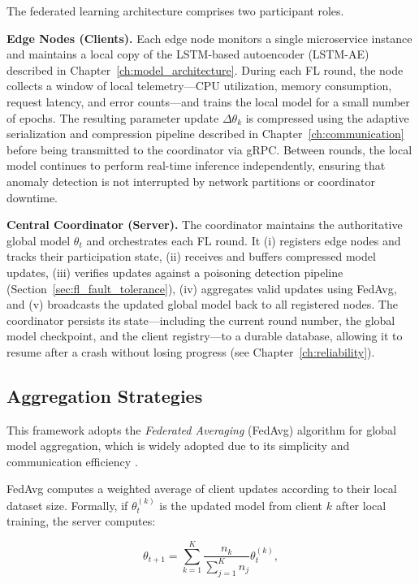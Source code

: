 The federated learning architecture comprises two participant roles.

\textbf{Edge Nodes (Clients).} Each edge node monitors a single microservice
instance and maintains a local copy of the LSTM-based autoencoder (LSTM-AE)
described in Chapter~\ref{ch:model_architecture}. During each FL round, the
node collects a window of local telemetry---CPU utilization, memory consumption,
request latency, and error counts---and trains the local model for a small
number of epochs. The resulting parameter update $\Delta\theta_k$ is compressed
using the adaptive serialization and compression pipeline described in
Chapter~\ref{ch:communication} before being transmitted to the coordinator via
gRPC. Between rounds, the local model continues to perform real-time inference
independently, ensuring that anomaly detection is not interrupted by network
partitions or coordinator downtime.

\textbf{Central Coordinator (Server).} The coordinator maintains the
authoritative global model $\theta_t$ and orchestrates each FL round. It (i)
registers edge nodes and tracks their participation state, (ii) receives and
buffers compressed model updates, (iii) verifies updates against a poisoning
detection pipeline (Section~\ref{sec:fl_fault_tolerance}), (iv) aggregates
valid updates using FedAvg, and (v) broadcasts the updated global model back to
all registered nodes. The coordinator persists its state---including the current
round number, the global model checkpoint, and the client registry---to a
durable database, allowing it to resume after a crash without losing progress
(see Chapter~\ref{ch:reliability}).

\subsection{Aggregation Strategies}
\label{subsec:fl_aggregation}

This framework adopts the \textit{Federated Averaging} (FedAvg) algorithm for 
global model aggregation, which is widely adopted due to its simplicity and 
communication efficiency \cite{mcmahan2017communication}.

FedAvg computes a weighted average of client updates according to their local dataset 
size. Formally, if $\theta_t^{(k)}$ is the updated model from client $k$ after 
local training, the server computes:

\begin{equation}
    \theta_{t+1} = \sum_{k=1}^{K} \frac{n_k}{\sum_{j=1}^{K} n_j} \theta_t^{(k)},
\end{equation}

